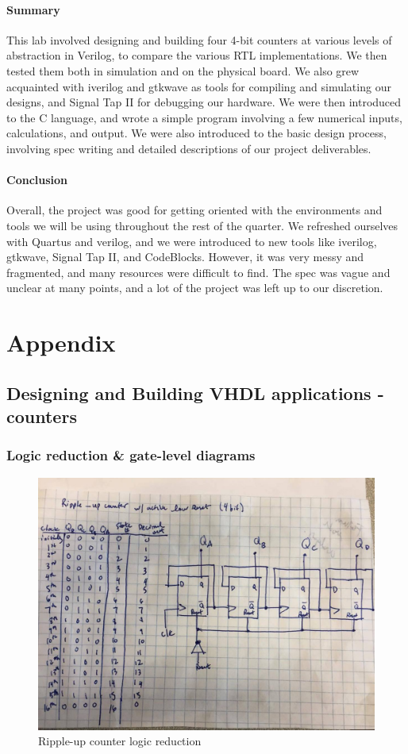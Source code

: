 \documentclass{article}
\begin{document}
  \paragraph{Summary} This lab involved designing and building four 4-bit counters at various levels of abstraction in Verilog, to compare the various RTL implementations. We then tested them both in simulation and on the physical board. We also grew acquainted with iverilog and gtkwave as tools for compiling and simulating our designs, and Signal Tap II for debugging our hardware. We were then introduced to the C language, and wrote a simple program involving a few numerical inputs, calculations, and output. We were also introduced to the basic design process, involving spec writing and detailed descriptions of our project deliverables.

  \paragraph{Conclusion} Overall, the project was good for getting oriented with the environments and tools we will be using throughout the rest of the quarter. We refreshed ourselves with Quartus and verilog, and we were introduced to new tools like iverilog, gtkwave, Signal Tap II, and CodeBlocks. However, it was very messy and fragmented, and many resources were difficult to find. The spec was vague and unclear at many points, and a lot of the project was left up to our discretion.



\section{Appendix}

\subsection{Designing and Building VHDL applications - counters}
	\subsubsection{Logic reduction \& gate-level diagrams}
		\begin{figure}[H]
			\centering
			\includegraphics[width=0.5\linewidth]{figures/gate_diagrams/rippleUp_gate.jpg}
			\caption{Ripple-up counter logic reduction}
		\end{figure}
\end{document}
